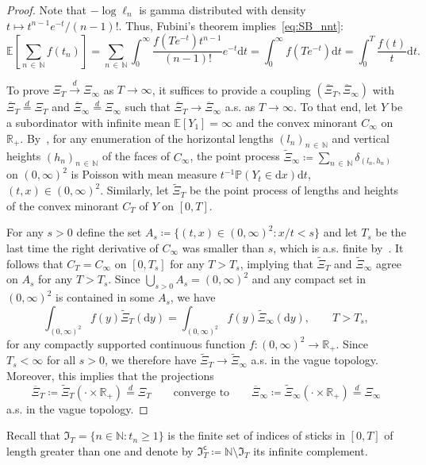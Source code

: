 \documentclass[10pt]{amsart}
\theoremstyle{definition}\newtheorem{defi}[theo]{Definition}\newtheorem{rema}[theo]{Remark}\newtheorem{exam}[theo]{Example}\newtheorem{exem}[theo]{Example}\newtheorem{nota}[theo]{Notation}
\newcommand\N{\mathbb{N}}
\newcommand\R{\mathbb{R}}
\newcommand\E{\mathds{E}}
\newcommand\p{\mathds{P}}
\newcommand\1{\mathds{1}}
\newcommand\D{\mathrm{d}}
\newcommand\GI{\mathfrak{I}}
\newcommand\co{\mathsf{c}}
\newcommand\eqd{\overset{d}{=}}
\newcommand\cid{\xrightarrow{d}}
\newcommand\ov[1]{\overline{#1}}
\newcommand\wt{\widetilde}
\begin{document}
\begin{proof}
Note that $-\log\ell_n$ is gamma distributed with density $t\mapsto t^{n-1}e^{-t}/(n-1)!$. Thus, Fubini's theorem implies~\eqref{eq:SB_nnt}:
\[
\E\left[\sum_{n\,\in\,\N}f(t_n)\right] =\sum_{n\,\in\,\N} \int_0^\infty
\frac{f\left(Te^{-t}\right)t^{n-1}}{(n-1)!}e^{-t}\D t =\int_0^\infty f\left(Te^{-t}\right)\D t =\int_0^T \frac{f(t)}{t}\D t.
\]

To prove $\Xi_T\cid\Xi_\infty$ as $T\to\infty$, it suffices to provide a coupling $(\ov\Xi_T,\ov\Xi_\infty)$ with $\ov\Xi_T\eqd\Xi_T$ and $\ov\Xi_\infty\eqd\Xi_\infty$ such that $\ov\Xi_T\to\ov\Xi_\infty$ a.s. as $T\to\infty$. To that end, let $Y$ be a subordinator with infinite mean $\E[Y_1]=\infty$ and the convex minorant $C_\infty$ on $\R_+$. By~\cite[Cor.~3]{MR2978134}, for any enumeration of the horizontal lengths $(l_n)_{n\,\in\,\N}$ and vertical heights $(h_n)_{n\,\in\,\N}$ of the faces of $C_\infty$, the point process $\wt\Xi_\infty\coloneqq\sum_{n\,\in\,\N}\delta_{(l_n,h_n)}$ on $(0,\infty)^2$ is Poisson with mean measure $t^{-1}\p(Y_t\in \D x)\D t$, $(t,x)\in(0,\infty)^2$. Similarly, let $\wt\Xi_T$ be the point process of lengths and heights of the convex minorant $C_T$ of $Y$ on $[0,T]$.

For any $s>0$ define the set $A_s\coloneqq \{(t,x)\in(0,\infty)^2: x/t<s\}$ and let $T_s$ be the last time the right derivative of $C_\infty$ was smaller than $s$, which is a.s. finite by~\cite[Corollary~3]{MR2978134}. It follows that $C_T=C_\infty$ on $[0,T_s]$ for any $T>T_s$, implying that $\wt\Xi_T$ and $\wt\Xi_\infty$ agree on $A_s$ for any $T>T_s$. Since $\bigcup_{s>0}A_s=(0,\infty)^2$ and any compact set in $(0,\infty)^2$ is contained in some $A_s$, we have
\[
\int_{(0,\infty)^2}f(y)\wt\Xi_T(\D y) =\int_{(0,\infty)^2}f(y)\wt\Xi_\infty(\D y),
\qquad T>T_s,
\]
for any compactly supported continuous function $f:(0,\infty)^2\to\R_+$. Since $T_s<\infty$ for all $s>0$, we therefore have $\wt\Xi_T\to\wt\Xi_\infty$ a.s. in the vague topology. Moreover, this implies that the projections
\[
\ov\Xi_T\coloneqq\wt\Xi_T\left(\cdot\times\R_+\right)\eqd\Xi_T\qquad\text{converge to}\qquad\ov\Xi_\infty\coloneqq\wt\Xi_\infty\left(\cdot\times\R_+\right)\eqd\Xi_\infty
\]
a.s. in the vague topology.
\end{proof}


Recall that $\GI_T=\{n\in\N:t_n\ge 1\}$ is the finite set of indices of sticks in $[0,T]$ of length greater than one and denote by $\GI_T^\co\coloneqq\N\setminus\GI_T$ its infinite complement.
\end{document}
